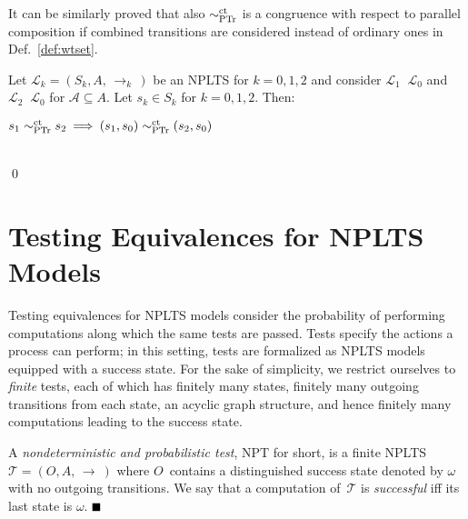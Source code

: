\documentclass{LMCS}
\newcommand{\cws}[2]
	{\\ \centerline{$#2$} \\[-#1pt]}
\newcommand{\cala}
        {\mathcal{A}}
\newcommand{\call}
        {\mathcal{L}}
\newcommand{\calt}
        {\mathcal{T}}
\newcommand{\arrow}[2]
        {\, {\auxarrow\limits^{#1}}_{#2} \,}
\newcommand{\auxarrow}
{\mathop{\longrightarrow}}
\newcommand{\sbis}[1]
	{\sim_{#1}}
\newcommand{\pco}[1]
	{\mathop{\Vert_{#1}}}
\newcommand{\fullbox}
	{{\mbox{}\nolinebreak\hfill{$\rule{2mm}{2mm}$}}}
\begin{document}
It can be similarly proved that also $\sbis{\rm PTr}^{\rm ct}$ is a congruence with respect to parallel
composition if combined transitions are considered instead of ordinary ones in Def.~\ref{def:wtset}.

	\begin{thm}\label{thm:ptr_ct_compos}

Let $\call_{k} = (S_{k}, A, \! \arrow{}{k} \!)$ be an NPLTS for $k = 0, 1, 2$ and consider $\call_{1}
\pco{\cala} \call_{0}$ and $\call_{2} \pco{\cala} \call_{0}$ for $\cala \subseteq A$. Let $s_{k} \in S_{k}$
for $k = 0, 1, 2$. Then:
\cws{12}{s_{1} \sbis{\rm PTr}^{\rm ct} s_{2} \: \Longrightarrow \: (s_{1}, s_{0}) \sbis{\rm PTr}^{\rm ct}
(s_{2}, s_{0})}
\qed 

	\end{thm}



\section{Testing Equivalences for NPLTS Models}
\label{sec:testing_equiv}


Testing equivalences for NPLTS models consider the probability of performing computations along which the
same tests are passed. Tests specify the actions a process can perform; in this setting, tests are
formalized as NPLTS models equipped with a success state. For the sake of simplicity, we restrict ourselves
to \emph{finite} tests, each of which has finitely many states, finitely many outgoing transitions from each
state, an acyclic graph structure, and hence finitely many computations leading to the success state.



	\begin{defi}

A \emph{nondeterministic and probabilistic test}, NPT for short, is a finite NPLTS $\calt = (O, A, \!
\arrow{}{} \!)$ where $O$~contains a distinguished success state denoted by $\omega$ with no outgoing
transitions. We say that a computation of~$\calt$ is \emph{successful} iff its last state is $\omega$.
\fullbox

	\end{defi}
\end{document}
